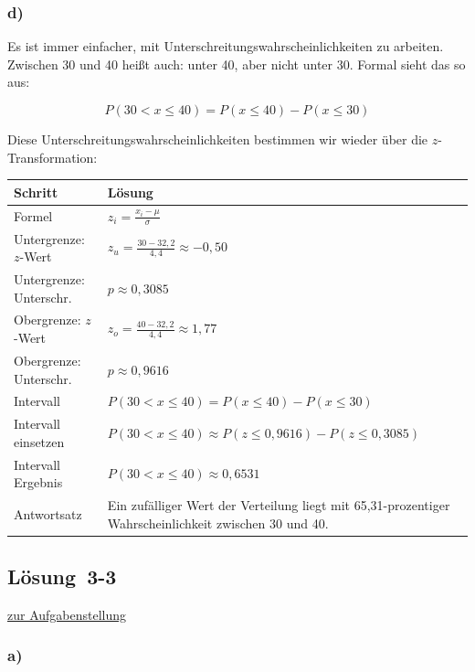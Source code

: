 \documentclass[
  11pt,
  ngerman,
  a4paper,
]{report}
\begin{document}
\hypertarget{d-2}{%
\subsubsection{d)}\label{d-2}}

Es ist immer einfacher, mit Unterschreitungs­wahrscheinlichkeiten zu arbeiten. Zwischen 30 und 40 heißt auch: unter 40, aber nicht unter 30. Formal sieht das so aus:

\[P(30 < x \leq 40) = P(x \leq 40) - P(x \leq 30)\]

Diese Unterschreitungs­wahrscheinlichkeiten bestimmen wir wieder über die \(z\)-Transformation:

\begin{table}[H]
\centering
\begin{tabular}{ll}
\toprule
Schritt & Lösung\\
\midrule
Formel & $z_{i} = \frac{x_{i} - \mu}{\sigma}$\\
Untergrenze: $z$-Wert & $z_{u}=\frac{30-32{,}2}{4{,}4}\approx-0{,}50$\\
Untergrenze: Unterschr. & $p \approx 0{,}3085$\\
Obergrenze: $z$-Wert & $z_{o}=\frac{40-32{,}2}{4{,}4}\approx1{,}77$\\
Obergrenze: Unterschr. & $p \approx 0{,}9616$\\
Intervall & $P(30 < x \leq 40) = P(x \leq 40) - P(x \leq 30)$\\
Intervall einsetzen & $P(30 < x \leq 40) \approx P(z \leq 0{,}9616) - P(z \leq 0{,}3085)$\\
Intervall Ergebnis & $P(30 < x \leq 40) \approx 0{,}6531$\\
Antwortsatz & Ein zufälliger Wert der Verteilung liegt mit 65,31-prozentiger Wahrscheinlichkeit zwischen 30 und 40.\\
\bottomrule
\end{tabular}
\end{table}

\hypertarget{loesung-3-3}{%
\subsection{Lösung~3-3}\label{loesung-3-3}}

\protect\hyperlink{aufgabe-3-3}{zur Aufgabenstellung}

\hypertarget{a-10}{%
\subsubsection{a)}\label{a-10}}
\end{document}
